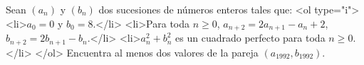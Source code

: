 Sean $(a_n)$ y $(b_n)$ dos sucesiones de números enteros tales que:
<ol type="i">
<li>$a_0=0$ y $b_0=8$.</li> 
<li>Para toda $n \geq 0$, $a_{n+2}=2a_{n+1}-a_{n}+2$, $b_{n+2}=2b_{n+1}-b_{n}$.</li>
<li>$a_{n}^{2}+b_{n}^{2}$ es un cuadrado perfecto para toda $n\ge 0$.</li>
</ol>
Encuentra al menos dos valores de la pareja $(a_{1992},b_{1992})$.